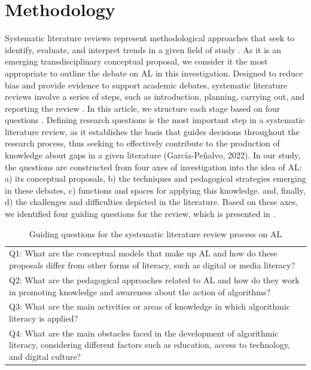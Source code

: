 \section{Methodology}\label{sec-metodologia}

Systematic literature reviews represent methodological approaches that seek to identify, evaluate, and interpret trends in a given field of study \cite{Garcia-Penalvo2022}. As it is an emerging transdisciplinary conceptual proposal, we consider it the most appropriate to outline the debate on AL in this investigation. Designed to reduce bias and provide evidence to support academic debates, systematic literature reviews involve a series of steps, such as introduction, planning, carrying out, and reporting the review \cite{White2005}. In this article, we structure each stage based on four questions . Defining research questions is the most important step in a systematic literature review, as it establishes the basis that guides decisions throughout the research process, thus seeking to effectively contribute to the production of knowledge about gaps in a given literature (García-Peñalvo, 2022).
In our study, the questions are constructed from four axes of investigation into the idea of AL: a) its conceptual proposals, b) the techniques and pedagogical strategies emerging in these debates, c) functions and spaces for applying this knowledge. and, finally, d) the challenges and difficulties depicted in the literature. Based on these axes, we identified four guiding questions for the review, which is presented in .

\begin{table}[!htpb]
\centering
\begin{threeparttable}
\caption{Guiding questions for the systematic literature review process on AL}
\label{tab-01}
\begin{tabular}{p{}}
\toprule
Q1: What are the conceptual models that make up AL and how do these proposals differ from other forms of literacy, such as digital or media literacy? \\
Q2: What are the pedagogical approaches related to AL and how do they work in promoting knowledge and awareness about the action of algorithms? \\
Q3: What are the main activities or areas of knowledge in which algorithmic literacy is applied? \\
Q4: What are the main obstacles faced in the development of algorithmic literacy, considering different factors such as education, access to technology, and digital culture? \\
\bottomrule
\end{tabular}
\end{threeparttable}
\end{table}
    
